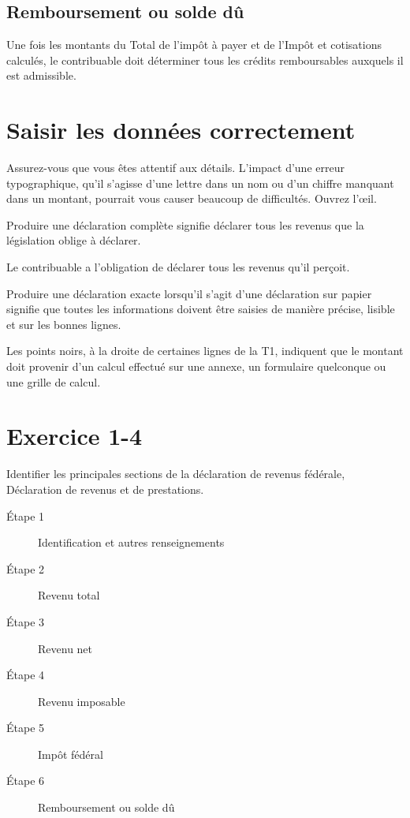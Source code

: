 \subsection{Remboursement ou solde dû}
Une fois les montants du \og Total de l'impôt à payer\fg{} \cat{} et de l'\og Impôt et cotisations \fg{}~\qct{} calculés, le contribuable doit déterminer tous les crédits remboursables auxquels il est admissible.



\section{Saisir les données correctement}
\begin{intro}
	Assurez-vous que vous êtes attentif aux détails. L'impact d'une erreur typographique, qu'il s'agisse d'une lettre dans un nom ou d'un chiffre manquant dans un montant, pourrait vous causer beaucoup de difficultés. Ouvrez l'œil.
\end{intro}
Produire une \og déclaration complète\fg{} signifie déclarer tous les revenus que la législation oblige à déclarer.

Le contribuable a l'obligation de déclarer tous les revenus qu'il perçoit.

Produire une déclaration exacte lorsqu'il s'agit d'une déclaration sur papier signifie que toutes les informations doivent être saisies de manière précise, lisible et sur les bonnes lignes.

Les points noirs, à la droite de certaines lignes de la T1, indiquent que le montant doit provenir d'un calcul effectué sur une annexe, un formulaire quelconque ou une grille de calcul.



\section{Exercice 1-4}
\setcounter{question}{0}
\begin{question}
	Identifier les principales sections de la déclaration de revenus fédérale, Déclaration de revenus et de prestations.
\end{question}
\begin{description}
	\item[Étape 1] Identification et autres renseignements
	\item[Étape 2] Revenu total
	\item[Étape 3] Revenu net
	\item[Étape 4] Revenu imposable
	\item[Étape 5] Impôt fédéral
	\item[Étape 6] Remboursement ou solde dû
\end{description}

